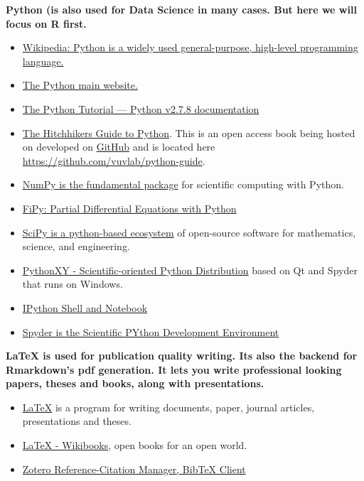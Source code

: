 \documentclass[11pt]{article} %
\begin{document}
{\bf Python (is also used for Data Science in many cases. 
  But here we will focus on R first. } 
\begin{itemize}
	\item \href{"https://en.wikipedia.org/wiki/Python_(programming_language)"}{Wikipedia: Python is a widely used general-purpose, high-level programming language.}  \cite{python_python_2014}
	\item \href{"https://www.python.org/"}{The Python main website.} \cite{python_python.org_2013}
	\item \href{"https://docs.python.org/2/tutorial/"}{The Python Tutorial — Python v2.7.8 documentation}  \cite{python_python_2014}
	\item \href{"http://docs.python-guide.org/en/latest/"}{The Hitchhikers Guide to Python}. This is an open access book being hosted on developed on \href{"https://github.com/"}{GitHub} and is located here \href{"https://github.com/vuvlab/python-guide"}{https://github.com/vuvlab/python-guide}. \cite{_hitchhikers_2014} \cite{_kennethreitz/python-guide_2014}
	\item \href{"http://www.numpy.org"}{NumPy is the fundamental package} \cite{numpy_numpy_2014} for scientific computing with Python.
	\item \href{"http://www.ctcms.nist.gov/fipy/"}{FiPy: Partial Differential Equations with Python} \cite{guyer_fipy:_2009}
	\item \href{"http://www.scipy.org/"}{SciPy is a python-based ecosystem}  \cite{scipy_scipy.org_2014} of open-source software for mathematics, science, and engineering. 
	\item \href{"https://code.google.com/p/pythonxy/"}{PythonXY - Scientific-oriented Python Distribution} based on Qt and Spyder that runs on Windows.  \cite{pythonxy_pythonxy_2014}
	\item \href{"http://ipython.org/index.html"}{IPython Shell and Notebook}  \cite{ipython_ipython_2014}
	\item \href{"https://code.google.com/p/spyderlib/"}{Spyder is the Scientific PYthon Development Environment}  \cite{spyder_spyder_2014}
\end{itemize}

{\bf LaTeX is used for publication quality writing. 
  Its also the backend for Rmarkdown's pdf generation. 
  It lets you write professional looking papers, theses and books, along with presentations. } 
\begin{itemize}
	\item \href{"http://www.tug.org/"}{LaTeX} is a program for writing documents, paper, journal articles, presentations and theses. \cite{_tex_2014}
	\item \href{"http://en.wikibooks.org/wiki/LaTeX"}{LaTeX - Wikibooks}, open books for an open world. \cite{latex_latex_2014}
	\item \href{"https://www.zotero.org/"}{Zotero Reference-Citation Manager, BibTeX Client}  \cite{zotero_zotero_2014}
\end{itemize}
\end{document}
